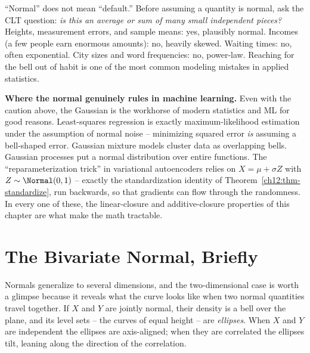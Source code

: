 \begin{trapbox}
``Normal'' does not mean ``default.'' Before assuming a quantity is normal, ask
the CLT question: \emph{is this an average or sum of many small independent
pieces?} Heights, measurement errors, and sample means: yes, plausibly normal.
Incomes (a few people earn enormous amounts): no, heavily skewed. Waiting times:
no, often exponential. City sizes and word frequencies: no, power-law. Reaching
for the bell out of habit is one of the most common modeling mistakes in applied
statistics.
\end{trapbox}

\begin{applicationbox}
\textbf{Where the normal genuinely rules in machine learning.} Even with the
caution above, the Gaussian is the workhorse of modern statistics and ML for good
reasons. Least-squares regression is exactly maximum-likelihood estimation under
the assumption of normal noise -- minimizing squared error \emph{is} assuming a
bell-shaped error. Gaussian mixture models cluster data as overlapping bells.
Gaussian processes put a normal distribution over entire functions. The
``reparameterization trick'' in variational autoencoders relies on
$X = \mu + \sigma Z$ with $Z\sim\Normal(0,1)$ -- exactly the standardization
identity of Theorem~\ref{ch12:thm-standardize}, run backwards, so that gradients
can flow through the randomness. In every one of these, the linear-closure and
additive-closure properties of this chapter are what make the math tractable.
\end{applicationbox}

\section{The Bivariate Normal, Briefly}
\label{ch12:bivariate}

Normals generalize to several dimensions, and the two-dimensional case is worth a
glimpse because it reveals what the curve looks like when two normal quantities
travel together. If $X$ and $Y$ are jointly normal, their density is a bell over
the plane, and its level sets -- the curves of equal height -- are \emph{ellipses}.
When $X$ and $Y$ are independent the ellipses are axis-aligned; when they are
correlated the ellipses tilt, leaning along the direction of the correlation.

